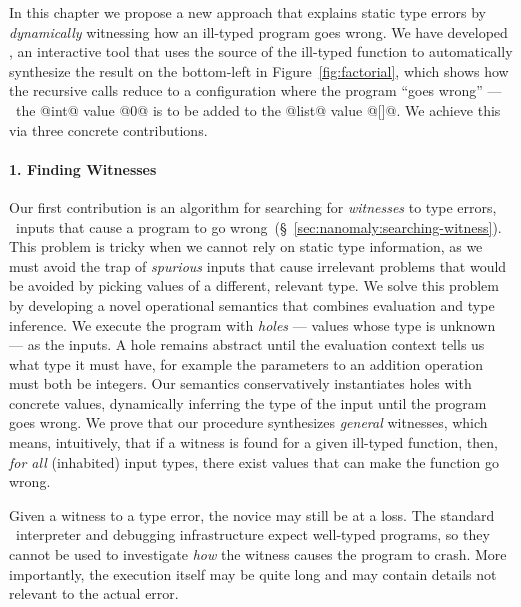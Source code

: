 In this chapter we propose a new approach that explains static type
errors by \emph{dynamically} witnessing how an ill-typed program goes
wrong.
%
We have developed \toolname, an interactive tool that uses
the source of the ill-typed function to automatically synthesize
the result on the bottom-left in Figure~\ref{fig:factorial}, which
shows how the recursive calls reduce to a configuration where
the program ``goes wrong'' --- \ie\ the @int@ value @0@ is to be
added to the @list@ value @[]@.
We achieve this via three concrete contributions.

\paragraph{1. Finding Witnesses}
Our first contribution is an algorithm for searching for
\emph{witnesses} to type errors, \ie\ inputs that cause a
program to go wrong~(\S~\ref{sec:nanomaly:searching-witness}).
%
This problem is tricky when we cannot rely on
static type information, as we must avoid the
trap of \emph{spurious} inputs that cause
irrelevant problems that would be avoided
by picking values of a different, relevant type.
%
We solve this problem by developing a novel
operational semantics that combines evaluation
and type inference.
%
We execute the program with \emph{holes} --- values whose type is
unknown --- as the inputs.
%
A hole remains abstract until the evaluation
context tells us what type it must have, for
example the parameters to an addition operation
must both be integers.
%
Our semantics conservatively instantiates holes
with concrete values, dynamically inferring the
type of the input until the program goes wrong.
%
We prove that our procedure synthesizes \emph{general}
witnesses, which means, intuitively, that if a witness
is found for a given ill-typed function, then, \emph{for all}
(inhabited) input types, there exist values that can make
the function go wrong.

Given a witness to a type error, the novice may still be at a loss.
%
The standard \ocaml\ interpreter and debugging infrastructure expect
well-typed programs, so they cannot be used to investigate \emph{how}
the witness causes the program to crash.
%
More importantly, the execution itself may be quite long and may contain
details not relevant to the actual error.


